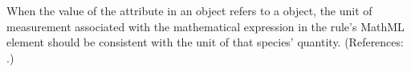 When the value of the attribute  in an \AssignmentRule
object refers to a \Species object, the unit of measurement associated with
the mathematical expression in the rule's MathML  element
should be consistent with the unit of that species' quantity.  (References:
.)
